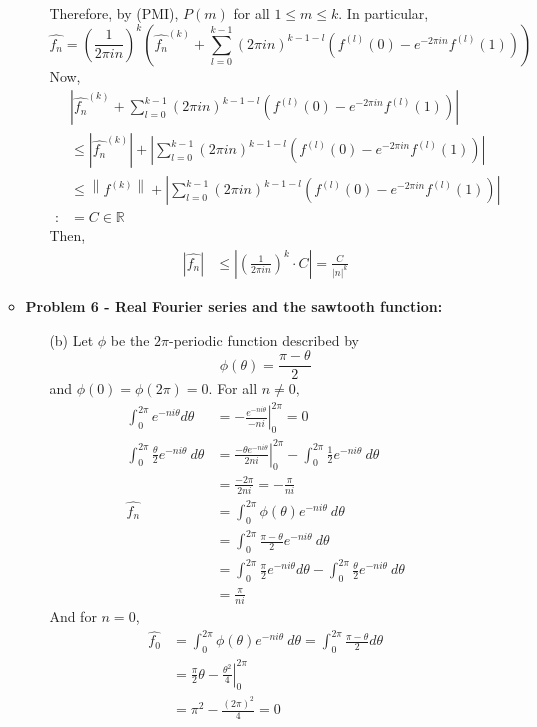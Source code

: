 \documentclass[12pt, reqno]{amsart}
\theoremstyle{definition}
\theoremstyle{remark}
\begin{document}
\begin{itemize}
\begin{itemize}
\begin{itemize}
Therefore, by (PMI), $P(m)$ for all $1\le m\le k$. In particular, $$\hat{f_{n}}= \left(\frac{1}{2\pi in}\right)^{k}\left(\hat{f_{n}}^{(k)}+\sum_{l=0}^{k-1}(2\pi in)^{k-1-l}(f^{(l)}(0)-e^{-2\pi in}f^{(l)}(1))\right)$$
Now, \begin{align*}
&\left|\hat{f_{n}}^{(k)}+\sum_{l=0}^{k-1}(2\pi in)^{k-1-l}(f^{(l)}(0)-e^{-2\pi in}f^{(l)}(1))\right|\\
&\le \left|\hat{f_{n}}^{(k)}\right|+\left|\sum_{l=0}^{k-1}(2\pi in)^{k-1-l}(f^{(l)}(0)-e^{-2\pi in}f^{(l)}(1))\right|\\
&\le \left\|f^{(k)}\right\|+\left|\sum_{l=0}^{k-1}(2\pi in)^{k-1-l}(f^{(l)}(0)-e^{-2\pi in}f^{(l)}(1))\right|\\
:&= C\in \mathbb{R}
\end{align*}
Then, \begin{align*}
\left|\hat{f_{n}}\right|&\le \left| \left(\frac{1}{2\pi in}\right)^{k}\cdot C\right|= \frac{C}{|n|^{k}}
\end{align*}

\end{itemize}

\newpage
\vspace{0.2 cm}
\item {\bf{Problem 6 - Real Fourier series and the sawtooth function:}}

\vspace{0.1 cm}
\begin{itemize}


\vspace{0.1 cm}
\item[(b)] 
Let $\phi$ be the $2\pi$-periodic function described by $$\phi(\theta)= \frac{\pi-\theta}{2}$$and $\phi(0)=\phi(2\pi)=0$. 
For all $n\ne0,$
\begin{align*}
\int_{0}^{2\pi}e^{-ni\theta}d\theta&= - \left.\frac{e^{-ni\theta}}{-ni}\right|_{0}^{2\pi}=0\\
\int_{0}^{2\pi} \frac{\theta}{2}e^{-ni \theta}\ d\theta&= \left.\frac{-\theta e^{-ni\theta}}{2ni}\right|^{2\pi}_{0}-\int_{0}^{2\pi} \frac{1}{2}e^{-ni\theta}\ d \theta\\
&= \frac{-2\pi}{2ni}=- \frac{\pi}{ni}\\
\hat{f_{n}}&= \int_{0}^{2\pi}\phi(\theta)e^{-ni \theta}\ d\theta\\
&= \int_{0}^{2\pi} \frac{\pi-\theta}{2}e^{-ni \theta}\ d \theta\\
&= \int_{0}^{2\pi} \frac{\pi}{2}e^{-ni \theta}d \theta-\int_{0}^{2\pi} \frac{\theta}{2}e^{-ni \theta}\ d \theta\\
&= \frac{\pi}{ni}
\end{align*}
And for $n=0$, \begin{align*}
\hat{f_{0}}&= \int_{0}^{2\pi}\phi(\theta)e^{-ni\theta}\ d\theta=\int_{0}^{2\pi} \frac{\pi-\theta}{2}d\theta\\
&=\left. \frac{\pi}{2}\theta- \frac{\theta^{2}}{4}\right|_{0}^{2\pi}\\
&= \pi^{2}- \frac{(2\pi)^{2}}{4}=0
\end{align*}


\end{itemize}
\end{itemize}
\end{itemize}
\end{document}
